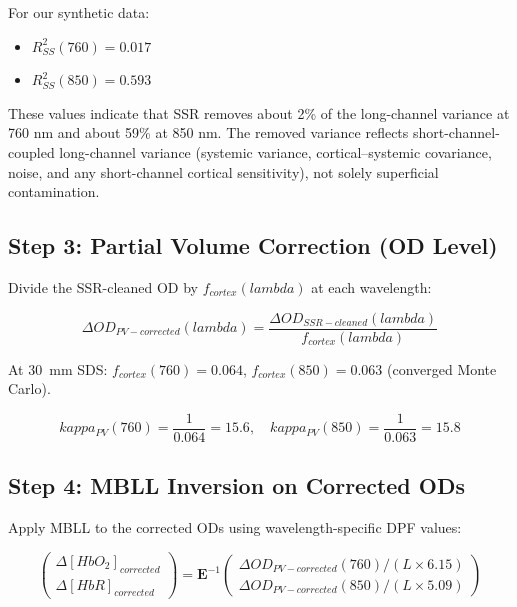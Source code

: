 \documentclass[12pt]{article}
\def\kappa{kappa}%
\def\lambda{lambda}%
\def\mathrm#1{#1}%
\def\text#1{#1}%
\def\,{ }%
\begin{document}
For our synthetic data:
\begin{itemize}
\item $R^2_{\mathrm{SS}}(760) = 0.017$
\item $R^2_{\mathrm{SS}}(850) = 0.593$
\end{itemize}

These values indicate that SSR removes about 2\% of the long-channel variance at 760\,nm and about 59\% at 850\,nm. The removed variance reflects short-channel-coupled long-channel variance (systemic variance, cortical--systemic covariance, noise, and any short-channel cortical sensitivity), not solely superficial contamination.

\subsection{Step 3: Partial Volume Correction (OD Level)}

Divide the SSR-cleaned OD by $f_{\text{cortex}}(\lambda)$ at each wavelength:

\begin{equation}
\Delta\text{OD}_{\text{PV-corrected}}(\lambda) = \frac{\Delta\text{OD}_{\text{SSR-cleaned}}(\lambda)}{f_{\text{cortex}}(\lambda)}
\end{equation}

At 30~mm SDS: $f_{\text{cortex}}(760) = 0.064$, $f_{\text{cortex}}(850) = 0.063$ (converged Monte Carlo).

\begin{equation}
\kappa_{\text{PV}}(760) = \frac{1}{0.064} = 15.6, \quad \kappa_{\text{PV}}(850) = \frac{1}{0.063} = 15.8
\end{equation}

\subsection{Step 4: MBLL Inversion on Corrected ODs}

Apply MBLL to the corrected ODs using wavelength-specific DPF values:

\begin{equation}
\begin{pmatrix} \Delta[\text{HbO}_2]_{\text{corrected}} \\ \Delta[\text{HbR}]_{\text{corrected}} \end{pmatrix} = \mathbf{E}^{-1} \begin{pmatrix} \Delta\text{OD}_{\text{PV-corrected}}(760) / (L \times 6.15) \\ \Delta\text{OD}_{\text{PV-corrected}}(850) / (L \times 5.09) \end{pmatrix}
\end{equation}
\end{document}

